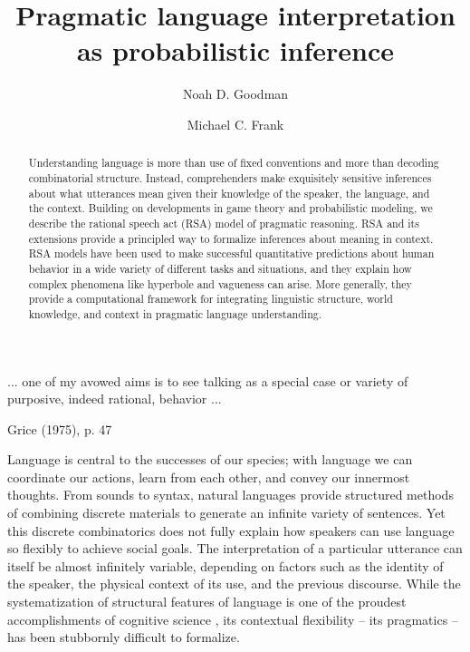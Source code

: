 \documentclass[]{elsarticle}
\title{Pragmatic language interpretation as probabilistic inference}
\author[stan]{Noah D. Goodman\corref{cor1}}
\author[stan]{Michael C. Frank}
\begin{document}
\begin{abstract}
Understanding language is more than use of fixed conventions and more than decoding combinatorial structure. Instead, comprehenders make exquisitely sensitive inferences about what utterances mean given their knowledge of the speaker, the language, and the context.
Building on developments in game theory and probabilistic modeling, we describe the rational speech act (RSA) model of pragmatic reasoning. RSA and its extensions provide a principled way to formalize inferences about meaning in context. RSA models have been used to make successful quantitative predictions about human behavior in a wide variety of different tasks and situations, and they explain how complex phenomena like hyperbole and vagueness can arise. More generally, they provide a computational framework for integrating linguistic structure, world knowledge, and context in pragmatic language understanding.
\end{abstract}

\maketitle

\epigraph{... one of my avowed aims is to see talking as a special case or
variety of purposive, indeed rational, behavior ...}{Grice (1975),
p. 47}

\label{introduction}

Language is central to the successes of our species; with language we
can coordinate our actions, learn from each other, and convey our
innermost thoughts. From sounds to syntax, natural languages provide
structured methods of combining discrete materials to generate an
infinite variety of sentences. Yet this discrete combinatorics does not
fully explain how speakers can use language so flexibly to achieve
social goals. The interpretation of a particular utterance
can itself be almost infinitely variable, depending on factors such as
the identity of the speaker, the physical context of its use, and the
previous discourse. While the systematization of structural features of
language is one of the proudest accomplishments of cognitive science \citep[e.g.,][]{chomsky1965,jackendoff2002,goldberg2003}, its contextual
flexibility -- its pragmatics -- has been stubbornly difficult to
formalize.
\end{document}

